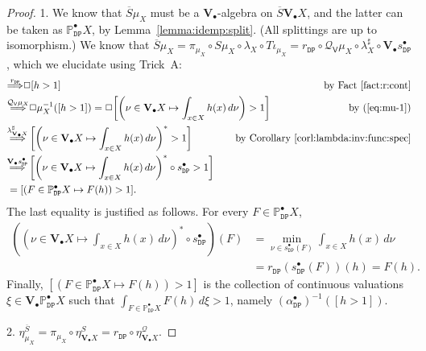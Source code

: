 \documentclass[preprint,12pt]{elsarticle}
\newcommand\Pred{\mathbb{P}}
\newcommand\Demon{{\mathtt{D}}}
\newcommand\Nature{{\mathtt{P}}}
\newcommand\DN{{\Demon\Nature}}
\newcommand\invto[1]{{\buildrel {#1} \over\Longrightarrow}}
\newcommand\Smyth{{\mathcal Q}}
\newcommand\Vt{\mathsf{V}}
\newcommand\SV{\Smyth_{\Vt}}
\newcommand\Val{{\mathbf V}}
\begin{document}
\begin{proof}
  1. We know that $\overline S \mu_X$ must be a $\Val_\bullet$-algebra
  on $\overline S {\Val_\bullet X}$, and the latter can be taken as
  $\Pred_\DN^\bullet X$, by Lemma~\ref{lemma:idemp:split}.  (All
  splittings are up to isomorphism.)  We know that
  $\overline S \mu_X = \pi_{\mu_X} \circ S \mu_X \circ \lambda_X \circ
  T\iota_{\mu_X} = r_\DN \circ \SV \mu_X \circ {\lambda^\sharp_X}
  \circ \Val_\bullet {s_\DN^\bullet}$, which we elucidate using
  Trick~A:
  \begin{align*}
    [h > 1]
    & \invto{r_\DN}
      \Box {[h > 1]}
    & \text{by Fact~\ref{fact:r:cont}} \\
    & \invto{\SV {\mu_X}}
      \Box {\mu_X^{-1} ([h > 1])}
      = \Box {\left[\left(\nu \in \Val_\bullet X \mapsto \int_{x \in X} h (x)
      \,d\nu\right) > 1\right]}
      \mskip-80mu
    & \text{by (\ref{eq:mu-1})} \\
    & \invto{\lambda^\sharp_{\Val_\bullet X}}
      \left[\left(\nu \in \Val_\bullet X \mapsto \int_{x \in X} h (x)
      \,d\nu\right)^* > 1\right]
    & \text{by Corollary~\ref{corl:lambda:inv:func:spec}} \\
    & \invto{\Val_\bullet {s_\DN^\bullet}}
      \left[\left(\nu \in \Val_\bullet X \mapsto \int_{x \in X} h (x)
      \,d\nu\right)^* \circ s_\DN^\bullet > 1\right] \\
    & = [(F \in \Pred_\DN^\bullet X \mapsto F (h)) > 1].
  \end{align*}
  The last equality is justified as follows.  For every
  $F \in \Pred_\DN^\bullet X$,
  \begin{align*}
    \left(\left(\nu \in \Val_\bullet X \mapsto \int_{x \in X} h (x)
    \,d\nu\right)^* \circ s_\DN^\bullet\right) (F)
    & = \min_{\nu \in s_\DN^\bullet (F)} \int_{x \in X} h (x)
      \,d\nu \\
    & = r_\DN (s_\DN^\bullet (F)) (h) = F (h).
  \end{align*}
  Finally, $[(F \in \Pred_\DN^\bullet X \mapsto F (h)) > 1]$ is the
  collection of continuous valuations $\xi \in \Val_\bullet
  {\Pred_\DN^\bullet X}$ such that $\int_{F \in \Pred_\DN^\bullet X} F
  (h) \,d\xi > 1$, namely ${(\alpha_\DN^\bullet)}^{-1} ([h > 1])$.

  2.
  $\eta^{\overline S}_{\mu_X} = \pi_{\mu_X} \circ \eta^S_{\Val_\bullet
    X} = r_\DN \circ \eta^\Smyth_{\Val_\bullet X}$.


\end{proof}
\end{document}
